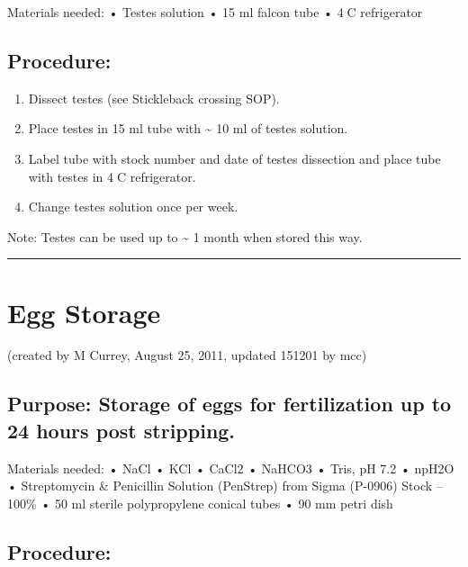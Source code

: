 \documentclass[
]{book}
\providecommand{\tightlist}{%
  \setlength{\itemsep}{0pt}\setlength{\parskip}{0pt}}
\begin{document}
Materials needed:
• Testes solution
• 15 ml falcon tube
• 4C refrigerator

\hypertarget{procedure-1}{%
\subsection{Procedure:}\label{procedure-1}}

\begin{enumerate}
\def\labelenumi{\arabic{enumi}.}
\tightlist
\item
  Dissect testes (see Stickleback crossing SOP).
\item
  Place testes in 15 ml tube with \textasciitilde{} 10 ml of testes solution.
\item
  Label tube with stock number and date of testes dissection and place tube with testes in 4C refrigerator.
\item
  Change testes solution once per week.
\end{enumerate}

Note: Testes can be used up to \textasciitilde{} 1 month when stored this way.

\begin{center}\rule{0.5\linewidth}{0.5pt}\end{center}

\hypertarget{egg-storage}{%
\section{Egg Storage}\label{egg-storage}}

(created by M Currey, August 25, 2011, updated 151201 by mcc)

\hypertarget{purpose-storage-of-eggs-for-fertilization-up-to-24-hours-post-stripping.}{%
\subsection{Purpose: Storage of eggs for fertilization up to 24 hours post stripping.}\label{purpose-storage-of-eggs-for-fertilization-up-to-24-hours-post-stripping.}}

Materials needed:
• NaCl
• KCl
• CaCl2
• NaHCO3
• Tris, pH 7.2
• npH2O
• Streptomycin \& Penicillin Solution (PenStrep) from Sigma (P-0906) Stock -- 100\%
• 50 ml sterile polypropylene conical tubes
• 90 mm petri dish

\hypertarget{procedure-2}{%
\subsection{Procedure:}\label{procedure-2}}
\end{document}
